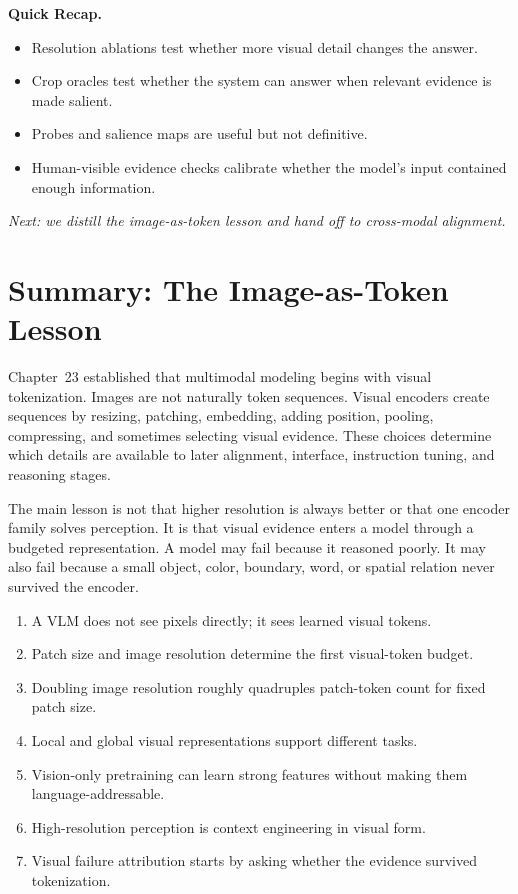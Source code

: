 \begin{quickrecap}
\textbf{Quick Recap.}
\begin{itemize}[nosep,leftmargin=1.5em]
  \item Resolution ablations test whether more visual detail changes the answer.
  \item Crop oracles test whether the system can answer when relevant evidence is made salient.
  \item Probes and salience maps are useful but not definitive.
  \item Human-visible evidence checks calibrate whether the model's input contained enough information.
\end{itemize}
\textit{Next: we distill the image-as-token lesson and hand off to cross-modal alignment.}
\end{quickrecap}


\section{Summary: The Image-as-Token Lesson}
\label{sec:ch23-summary}

Chapter~23 established that multimodal modeling begins with visual tokenization. Images are not naturally token sequences. Visual encoders create sequences by resizing, patching, embedding, adding position, pooling, compressing, and sometimes selecting visual evidence. These choices determine which details are available to later alignment, interface, instruction tuning, and reasoning stages.

The main lesson is not that higher resolution is always better or that one encoder family solves perception. It is that visual evidence enters a model through a budgeted representation. A model may fail because it reasoned poorly. It may also fail because a small object, color, boundary, word, or spatial relation never survived the encoder.

\begin{takeaways}
\begin{enumerate}[nosep]
  \item A VLM does not see pixels directly; it sees learned visual tokens.
  \item Patch size and image resolution determine the first visual-token budget.
  \item Doubling image resolution roughly quadruples patch-token count for fixed patch size.
  \item Local and global visual representations support different tasks.
  \item Vision-only pretraining can learn strong features without making them language-addressable.
  \item High-resolution perception is context engineering in visual form.
  \item Visual failure attribution starts by asking whether the evidence survived tokenization.
\end{enumerate}
\end{takeaways}

